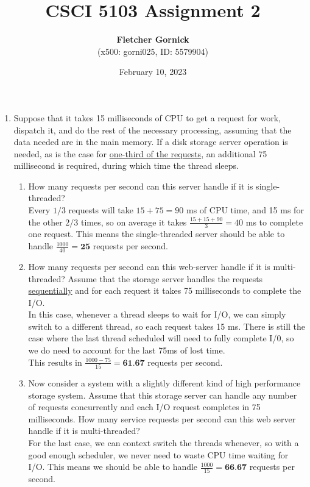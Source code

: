 \documentclass[11pt]{article}
\title{\vspace{-1.0cm}\textbf{CSCI 5103 Assignment 2}}
\date{February 10, 2023}
\author{\textbf{Fletcher Gornick}\\(x500: gorni025, ID: 5579904)}
\newcommand{\n}{\vspace{0.3cm}}
\begin{document}
\maketitle

\begin{enumerate}
  \item Suppose that it takes 15 milliseconds of CPU to get a request for work, dispatch it, and do the rest of the necessary processing, assuming that the data needed are in the main memory.  If a disk storage server operation is needed, as is the case for \ul{one-third of the requests}, an additional 75 millisecond is required, during which time the thread sleeps.
    \begin{enumerate}
      \item How many requests per second can this server handle if it is single-threaded? \n\\
        Every \(1/3\) requests will take \(15+75=90\) ms of CPU time, and 15 ms for the other \(2/3\) times, so on average it takes \(\frac{15 + 15 + 90}{3} = 40\) ms to complete one request.  This means the single-threaded server should be able to handle \(\frac{1000}{40} = \textbf{25}\) requests per second. \n

      \item How many requests per second can this web-server handle if it is multi-threaded?  Assume that the storage server handles the requests \ul{sequentially} and for each request it takes 75 milliseconds to complete the I/O. \n\\
        In this case, whenever a thread sleeps to wait for I/O, we can simply switch to a different thread, so each request takes 15 ms.  There is still the case where the last thread scheduled will need to fully complete I/0, so we do need to account for the last 75ms of lost time. \\
        This results in \(\frac{1000 - 75}{15} = \textbf{61.67}\) requests per second.\n

      \item Now consider a system with a slightly different kind of high performance storage system.  Assume that this storage server can handle any number of requests concurrently and each I/O request completes in 75 milliseconds.  How many service requests per second can this web server handle if it is multi-threaded? \n\\
        For the last case, we can context switch the threads whenever, so with a good enough scheduler, we never need to waste CPU time waiting for I/O.  This means we should be able to handle \(\frac{1000}{15} = \textbf{66.67}\) requests per second. \n
    \end{enumerate}
    \newpage


\end{enumerate}
\end{document}
